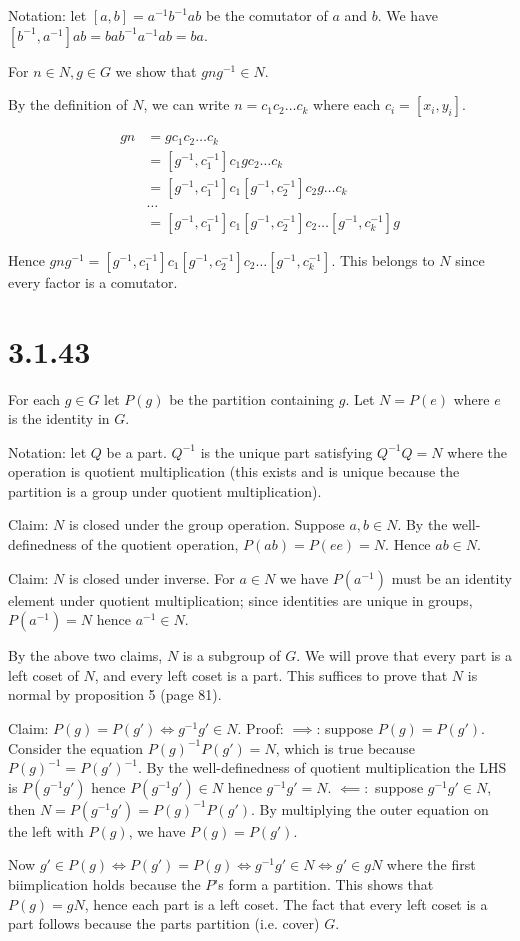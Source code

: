 \documentclass{article}
\def\inv{{-1}}
\begin{document}
Notation: let $[a, b] = a^\inv b^\inv ab$ be the comutator of $a$ and $b$. We have $[b^\inv, a^\inv]ab = bab^\inv a^\inv ab = ba$. 

For $n \in N, g \in G$ we show that $gng^\inv \in N$. 

By the definition of $N$, we can write $n = c_1 c_2 \ldots c_k$ where each $c_i = [x_i, y_i]$.

\begin{align*}
gn &= g c_1 c_2 \ldots c_k \\
&= [g^\inv ,c_1^\inv]c_1 g c_2 \ldots c_k \\
&= [g^\inv, c_1^\inv]c_1[g^\inv, c_2^\inv]c_2 g \ldots c_k \\
&\ldots \\
&= [g^\inv, c_1^\inv]c_1[g^\inv, c_2^\inv]c_2 \ldots [g^\inv, c_k^\inv]g
\end{align*}

Hence $gng^\inv = [g^\inv, c_1^\inv]c_1[g^\inv, c_2^\inv]c_2 \ldots [g^\inv, c_k^\inv]$. This belongs to $N$ since every factor is a comutator.

\section*{3.1.43}

For each $g \in G$ let $P(g)$ be the partition containing $g$. Let $N = P(e)$ where $e$ is the identity in $G$.

Notation: let $Q$ be a part. $Q^\inv$ is the unique part satisfying $Q^\inv Q = N$ where the operation is quotient multiplication (this exists and is unique because the partition is a group under quotient multiplication).

Claim: $N$ is closed under the group operation. Suppose $a, b \in N$. By the well-definedness of the quotient operation, $P(ab) = P(ee) = N$. Hence $ab \in N$.

Claim: $N$ is closed under inverse. For $a \in N$ we have $P(a^\inv)$ must be an identity element under quotient multiplication; since identities are unique in groups, $P(a^\inv) = N$ hence $a^\inv \in N$.

By the above two claims, $N$ is a subgroup of $G$. We will prove that every part is a left coset of $N$, and every left coset is a part. This suffices to prove that $N$ is normal by proposition 5 (page 81).

Claim: $P(g) = P(g') \iff g^\inv g' \in N$. Proof: $\implies$: suppose $P(g) = P(g')$. Consider the equation $P(g)^\inv P(g') = N$, which is true because $P(g)^\inv = P(g')^\inv$. By the well-definedness of quotient multiplication the LHS is $P(g^\inv g')$ hence $P(g^\inv g') \in N$ hence $g^\inv g' = N$. $\impliedby:$ suppose $g^\inv g' \in N$, then $N = P(g^\inv g') = P(g)^\inv P(g')$. By multiplying the outer equation on the left with $P(g)$, we have $P(g) = P(g')$.

Now $g' \in P(g) \iff P(g') = P(g)  \iff g^\inv g' \in N \iff g' \in gN$ where the first biimplication holds because the $P$'s form a partition. This shows that $P(g) = gN$, hence each part is a left coset. The fact that every left coset is a part follows because the parts partition (i.e. cover) $G$.

\end{document}
